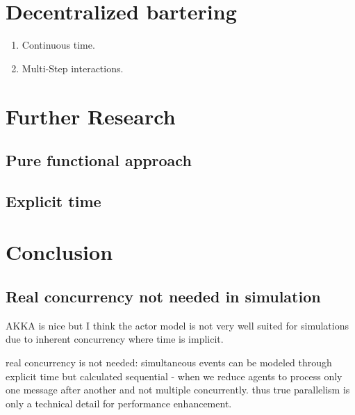 \documentclass{article}
\begin{document}
\section{Decentralized bartering}

\begin{enumerate}
\item Continuous time.
\item Multi-Step interactions.
\end{enumerate}

\section{Further Research}
\subsection{Pure functional approach}
\subsection{Explicit time}

\section{Conclusion}
\subsection{Real concurrency not needed in simulation}
AKKA is nice but I think the actor model is not very well suited for simulations  due to inherent concurrency where time is implicit. 

real concurrency is not needed: simultaneous events can be modeled through explicit time but calculated sequential - when we reduce agents to process only one message after another and not multiple concurrently. thus true parallelism is only a technical detail for performance enhancement.






\end{document}

